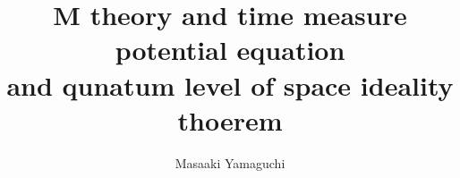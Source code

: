 \documentclass{jsarticle}
\begin{document}
\title{M theory and time measure potential equation \\
and qunatum level of space ideality thoerem}
\author{Masaaki Yamaguchi}
\date{}
\maketitle
  \newcommand{\whitewithbodercircle}
  {\text{\textcircled{\phantom{\textbullet}}}
  \kern-0.9em\text{\textcircled{\phantom{}}}}
     
    \newcommand{\variint}{%
	\begin{picture}(15,30)
		\put(0,0){
			$ \iint $}
		\put(0,5){\line(15,0){15}}
	\end{picture} %
}
    \newcommand{\varint}{%
	\begin{picture}(15,30)
		\put(0,0){
			$ \int $}
		\put(0,5){\line(15,0){15}}
	\end{picture} %
}
 
  \newcommand{\variiint}{%
	\begin{picture}(15,30)
		\put(0,0){
			$ \iiint $}
		\put(0,5){\line(15,0){15}}
	\end{picture} %
}


 
  \newcommand{\whitewithblack}{\text{\textcircled{\textbullet}}}
  \newcommand{\whitewithblacksquare}{\text{\fbox{\text{\rule{0.5em}
  {0.5em}}}}}
  \newcommand{\whitewithwhitesquare}{\text{\fbox{\text{\phantom
  {\rule{0.5em}{0.5em}}}}}}
 \newcommand{\whitewithbodercircleiiint}{%
	 \begin{picture}(30,45)
		 \put(0,0){\scalebox{2.0}[2]{$\whitewithbodercircle$}}
		 \put(0,0){\scalebox{2.0}[2]{$\iiint$}}
	 \end{picture}%
	 }
\newcommand{\whitewithbodercircleint}{%
	 \begin{picture}(30,45)
		 \put(0,0){\scalebox{2.0}[2]{$\whitewithbodercircle$}}
		 \put(0,0){\scalebox{2.0}[2]{$\int$}}
	 \end{picture}%
	 }
 \newcommand{\whitewithbodercirclevarint}{%
	 \begin{picture}(30,45)
		 \put(0,0){\scalebox{2.0}[2]{$\whitewithbodercircle$}}
		 \put(0,0){\scalebox{2.0}[2]{$\varint$}}
	 \end{picture}%
	 }
 
 \newcommand{\whitewithbodercirclevariiint}{%
	 \begin{picture}(30,45)
		 \put(0,0){\scalebox{2.0}[2]{$\whitewithbodercircle$}}
		 \put(0,0){\scalebox{2.0}[2]{$\variiint$}}
	 \end{picture}%
	 }
 
\end{document}
